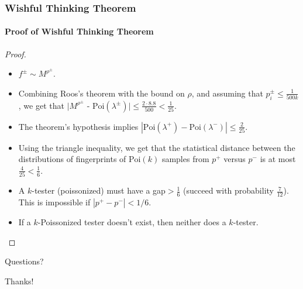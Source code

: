 \documentclass{beamer}
\begin{document}
\begin{frame}
  \frametitle{Wishful Thinking Theorem} \framesubtitle{Proof of
    Wishful Thinking Theorem}  
    
    \begin{proof}
    \begin{itemize}
    \item<1-> $f^\pm\sim M^{\rho^\pm}$.
    \item<2-> Combining Roos's theorem with the bound on $\rho$, and
      assuming that $p_i^\pm\le\frac{1}{500k}$, we get that $|M^{\rho^\pm}$ -
      $\mbox{Poi}(\lambda^\pm)|\le \frac{2\cdot 8.8}{500}<\frac{1}{25}$.
    \item<3-> The theorem's hypothesis implies
      $|\mbox{Poi}(\lambda^+)-\mbox{Poi}(\lambda^-)|\le\frac{2}{25}$.
    \item<4-> Using the triangle inequality, we get that the
      statistical distance between the distributions of fingerprints
      of $\mbox{Poi}(k)$ samples from $p^+$ versus $p^-$ is at most
      $\frac{4}{25}<\frac{1}{6}$.
    \item<5-> A $k$-tester (poissonized) must have a gap$>\frac{1}{6}$
      (succeed with probability $\frac{7}{12}$). This is impossible if
      $|p^+-p^-|<1/6$.
    \item<6-> If a $k$-Poissonized tester doesn't exist, then neither
      does a $k$-tester.
    \end{itemize}
    \end{proof}
\end{frame}

\begin{frame}
  Questions?
\end{frame}

\begin{frame}
  Thanks!
\end{frame}
\end{document}
